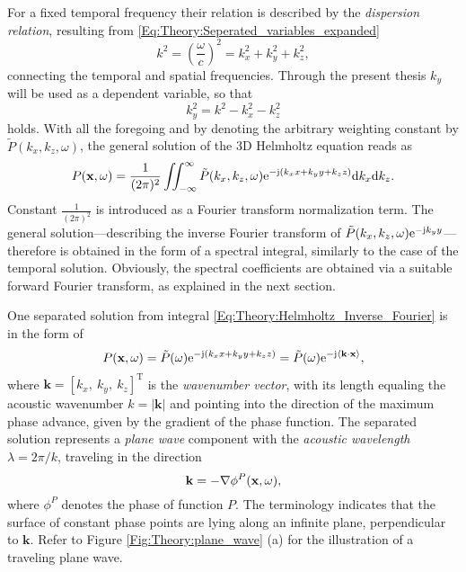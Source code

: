 For a fixed temporal frequency their relation is described by the \emph{dispersion relation}, resulting from \eqref{Eq:Theory:Seperated_variables_expanded}
\begin{equation}
\label{Eq:Theory:dispersion_relation}
k^2 = \left( \frac{\omega}{c} \right)^2 = k_x^2 + k_y^2 + k_z^2,
\end{equation}
connecting the temporal and spatial frequencies.
Through the present thesis $k_y$ will be used as a dependent variable, so that
\begin{equation}
k_y^2 = k^2 - k_x^2 - k_z^2
\end{equation}
holds.
With all the foregoing and by denoting the arbitrary weighting constant by $\tilde{P}(k_x,k_z, \omega)$, the general solution of the 3D Helmholtz equation reads as
\begin{equation}
P(\mathbf{x},\omega) = \frac{1}{(2\pi)^2}\iint_{-\infty}^{\infty} \tilde{P}(k_x,k_z, \omega)  \mathrm{e}^{- \mathrm{j} \left( k_x x + k_y y + k_z z \right) }
\mathrm{d} k_x\mathrm{d} k_z.
\label{Eq:Theory:Helmholtz_Inverse_Fourier}
\end{equation}
Constant $\frac{1}{(2\pi)^2}$ is introduced as a Fourier transform normalization term. 
The general solution---describing the inverse Fourier transform of $\tilde{P}(k_x,k_z, \omega)  \mathrm{e}^{- \mathrm{j} k_y y }$---therefore is obtained in the form of a spectral integral, similarly to the case of the temporal solution.
Obviously, the spectral coefficients are obtained via a suitable forward Fourier transform, as explained in the next section.

One separated solution from integral \eqref{Eq:Theory:Helmholtz_Inverse_Fourier} is in the form of
\begin{equation}
P(\mathbf{x},\omega) = \tilde{P}(\omega) \mathrm{e}^{-\mathrm{j} \left( k_x x + k_y y + k_z z \right) } =  \tilde{P}(\omega) \mathrm{e}^{-\mathrm{j} \left< \mathbf{k} \cdot \mathbf{x} \right> },
\end{equation}
where $\mathbf{k} = [k_x,\ k_y,\ k_z]^{\mathrm{T}}$ is the \emph{wavenumber vector}, with its length equaling the acoustic wavenumber $k = | \mathbf{k}|$ and pointing into the direction of the maximum phase advance, given by the gradient of the phase function.
The separated solution represents a \emph{plane wave} component with the \emph{acoustic wavelength} $\lambda = 2\pi/k$, traveling in the direction
\begin{equation}
\mathbf{k} = - \nabla \phi^P(\mathbf{x},\omega),
\label{Eq:Theory:PW_wavenumber_vec}
\end{equation}
where $\phi^P$ denotes the phase of function $P$.
The terminology indicates that the surface of constant phase points are lying along an infinite plane, perpendicular to $\mathbf{k}$. Refer to Figure \ref{Fig:Theory:plane_wave} (a) for the illustration of a traveling plane wave.

